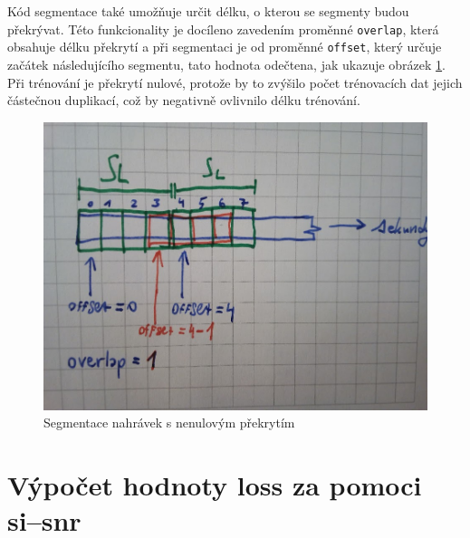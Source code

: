 Kód segmentace také umožňuje určit délku, o kterou se segmenty budou překrývat. Této funkcionality je docíleno zavedením proměnné \texttt{overlap}, která obsahuje délku překrytí a při segmentaci je od proměnné \texttt{offset}, který určuje začátek následujícího segmentu, tato hodnota odečtena, jak ukazuje obrázek \ref{fig:segment_overlap}. Při trénování je překrytí nulové, protože by to zvýšilo počet trénovacích dat jejich částečnou duplikací, což by negativně ovlivnilo délku trénování.

\begin{figure}[H]
    \centering
    \includegraphics[scale=0.25]{obrazky-figures/segment_overlap.jpg}
    \caption{\label{fig:segment_overlap}Segmentace nahrávek s nenulovým překrytím}
\end{figure}

\section{Výpočet hodnoty loss za pomoci si--snr}

